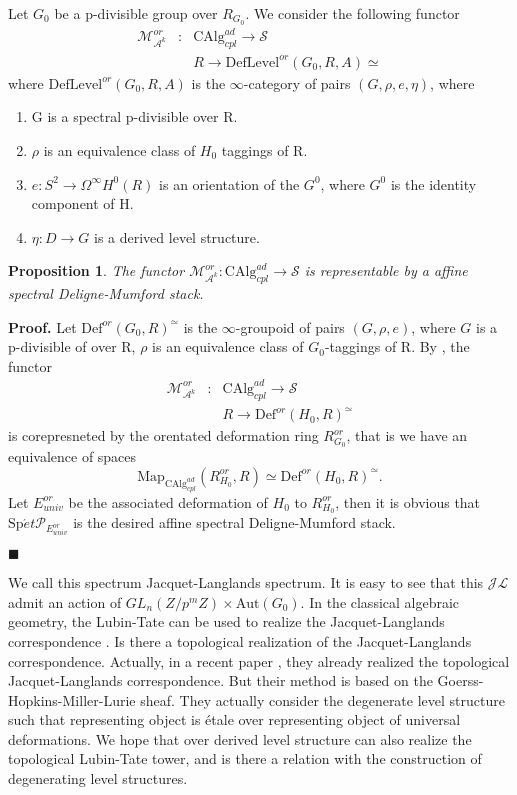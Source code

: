 \documentclass[12pt]{article}
\newtheorem{proposition}[theorem]{Proposition}
\theoremstyle{thry}
\renewenvironment{proof}
{\par \noindent \textbf{Proof.}}
{ \par \hfill $\blacksquare$ \quad \par }
\def  \Aut      {\mathrm{Aut}}
\def  \CAlg     {\mathrm{CAlg}}
\def  \Def      {\mathrm{Def}}
\def  \Map      {\mathrm{Map}}
\def  \Spet     {\mathrm{Sp}\acute{e}t}
\def  \ca       {\mathcal{A}}
\def  \cj       {\mathcal{J}}
\def  \cl       {\mathcal{L}}
\def  \cm       {\mathcal{M}}
\def  \cp       {\mathcal{P}}
\def  \cs       {\mathcal{S}}
\begin{document}
Let $G_0$ be a p-divisible group over $R_{G_0}$.
We consider the following functor
\begin{eqnarray*}
	\cm^{or}_{\ca^k} &: &\CAlg^{ad}_{cpl} \to \cs  \\
	&  & R \to  \mathrm{DefLevel}^{or}(G_0,R, A)\simeq
\end{eqnarray*}
where $\mathrm{DefLevel}^{or}(G_0,R, A)$ is the $\infty$-category of pairs $(G, \rho,e, \eta)$, where
\begin{enumerate}
	\item G is a spectral p-divisible over R.
	\item $\rho$ is an equivalence class of $H_0$ taggings  of  R.
	\item $e:S^2 \to \Omega^{\infty}H^{0}(R)$ is an orientation of the $G^{0}$, where $G^{0}$ is the identity component of H.
	\item  $\eta:  D\to G $ is a derived level structure.
\end{enumerate}
\begin{proposition}
	The functor $	\cm^{or}_{\ca^k}:\CAlg^{ad}_{cpl} \to \cs$ is representable by a affine spectral Deligne-Mumford stack.
\end{proposition}
\begin{proof}
 Let $\Def^{or}(G_0,R)^{\simeq}$ is the $\infty$-groupoid of pairs $(G, \rho, e)$, where $G$ is a p-divisible of over R, $\rho$ is an equivalence class of $G_0$-taggings of R. By \cite[Theorem 6.0.3, Remark 6.0.7]{lu-EC2}, the functor
	\begin{eqnarray*}
		\cm^{or}_{\ca^k} &: &\CAlg^{ad}_{cpl} \to \cs  \\
		&  & R \to  \Def^{or}(H_0,R)^{\simeq}
	\end{eqnarray*}
	is corepresneted by the  orentated deformation ring $R^{or}_{G_0}$, that is we have an equivalence of spaces
	$$
	\Map_{\CAlg^{ad}_{cpl}}(R^{or}_{H_0}, R) \simeq \Def^{or}(H_0,R)^{\simeq}.
	$$
	Let $E^{or}_{univ}$ be the associated deformation of $H_0$ to $R^{or}_{H_0}$, then it is obvious that $\Spet \cp_{E^{or}_{univ}}$ is the desired  affine spectral Deligne-Mumford stack.
\end{proof}


We call this spectrum Jacquet-Langlands spectrum. It is easy to see that this $ \cj \cl$ admit an action of $GL_n(Z/p^m Z) \times \Aut(G_0)$. In the classical algebraic geometry, the Lubin-Tate can be used to realize the Jacquet-Langlands correspondence \cite{harris2001geometry}. Is there a topological realization of the Jacquet-Langlands correspondence.  Actually, in a recent paper \cite{Salch2023elladicTJ}, they already realized the topological Jacquet-Langlands correspondence. But their method is based on the  Goerss-Hopkins-Miller-Lurie sheaf. They actually consider the degenerate level structure such that representing object is \'etale over representing object of universal deformations.  We hope that over  derived level structure  can also realize the topological Lubin-Tate tower,  and is there a relation with the construction of degenerating level structures.
\end{document}

